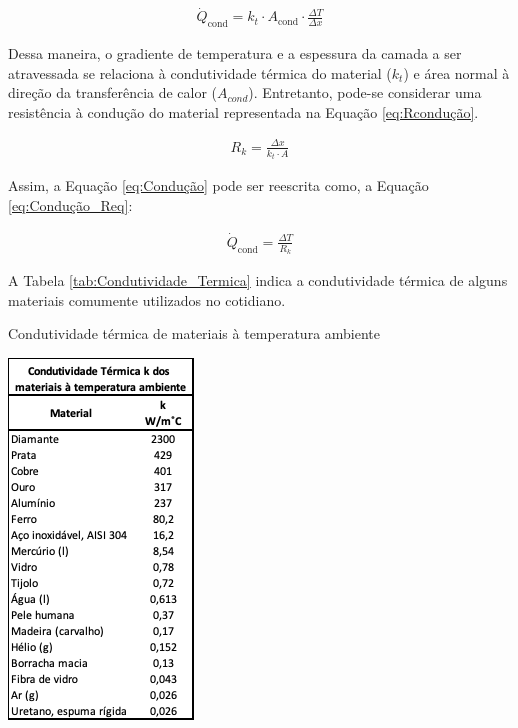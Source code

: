 \documentclass[acronym,symbols,table]{fei}
\begin{document}
\begin{equation} \label{eq:Condução}
\begin{aligned}
    \dot{Q}_{\text{cond}} = k_{t} \cdot A_{\text{cond}} \cdot \frac{\Delta T}{\Delta x}
\end{aligned}
\end{equation}

Dessa maneira, o gradiente de temperatura e a espessura da camada a ser atravessada se relaciona à condutividade térmica do material ($k_{t}$) e área normal à direção da transferência de calor ($A_{cond}$). Entretanto, pode-se considerar uma resistência à condução do material representada na Equação \ref{eq:Rcondução}.

\begin{equation} \label{eq:Rcondução}
\begin{aligned}
    {R}_{k}=\frac{\Delta x}{k_{t} \cdot A}
\end{aligned}
\end{equation}

Assim, a Equação \ref{eq:Condução} pode ser reescrita como, a Equação \ref{eq:Condução_Req}:

\begin{equation} \label{eq:Condução_Req}
\begin{aligned}
    \dot{Q}_{\text{cond}} = \frac{\Delta T}{{R}_{k}}
\end{aligned}
\end{equation}

A Tabela \ref{tab:Condutividade_Termica} indica a condutividade térmica de alguns materiais comumente utilizados no cotidiano.

\begin{table}[!htb] 
 \centering
    \caption{Condutividade térmica de materiais à temperatura ambiente}
    \includegraphics[width=0.4\linewidth]{Tabelas/Condutividade_Termica.png}
    \label{tab:Condutividade_Termica}
\end{table}
\end{document}
